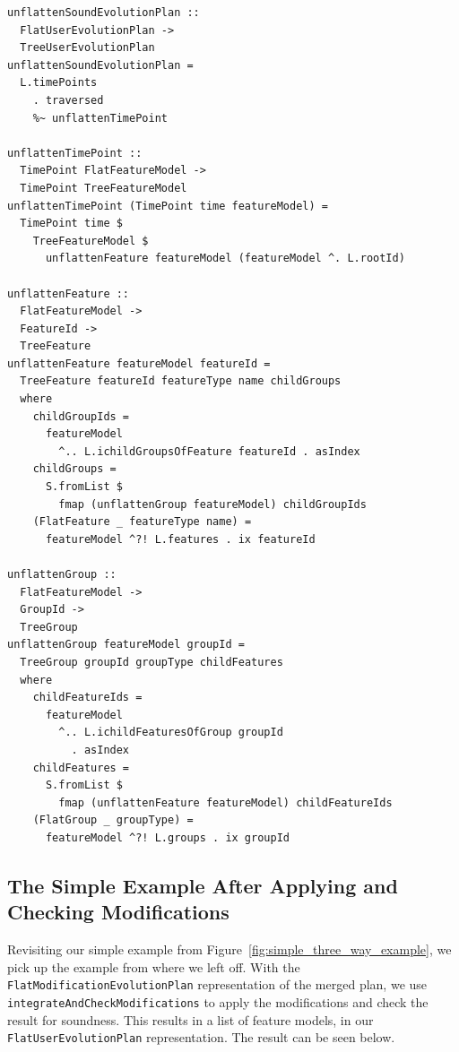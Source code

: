 \documentclass[a4paper,english]{ifimaster}
\begin{document}
\begin{verbatim}
unflattenSoundEvolutionPlan ::
  FlatUserEvolutionPlan ->
  TreeUserEvolutionPlan
unflattenSoundEvolutionPlan =
  L.timePoints
    . traversed
    %~ unflattenTimePoint

unflattenTimePoint ::
  TimePoint FlatFeatureModel ->
  TimePoint TreeFeatureModel
unflattenTimePoint (TimePoint time featureModel) =
  TimePoint time $
    TreeFeatureModel $
      unflattenFeature featureModel (featureModel ^. L.rootId)

unflattenFeature ::
  FlatFeatureModel ->
  FeatureId ->
  TreeFeature
unflattenFeature featureModel featureId =
  TreeFeature featureId featureType name childGroups
  where
    childGroupIds =
      featureModel
        ^.. L.ichildGroupsOfFeature featureId . asIndex
    childGroups =
      S.fromList $
        fmap (unflattenGroup featureModel) childGroupIds
    (FlatFeature _ featureType name) =
      featureModel ^?! L.features . ix featureId

unflattenGroup ::
  FlatFeatureModel ->
  GroupId ->
  TreeGroup
unflattenGroup featureModel groupId =
  TreeGroup groupId groupType childFeatures
  where
    childFeatureIds =
      featureModel
        ^.. L.ichildFeaturesOfGroup groupId
          . asIndex
    childFeatures =
      S.fromList $
        fmap (unflattenFeature featureModel) childFeatureIds
    (FlatGroup _ groupType) =
      featureModel ^?! L.groups . ix groupId
\end{verbatim}

\subsection{The Simple Example After Applying and Checking Modifications}%
\label{sub:the_simple_example_after_applying_and_checking_modifications}

Revisiting our simple example from Figure~\vref{fig:simple_three_way_example}, we pick up the example from where we left off. With the \texttt{FlatModificationEvolutionPlan} representation of the merged plan, we use \texttt{integrateAndCheckModifications} to apply the modifications and check the result for soundness. This results in a list of feature models, in our \texttt{FlatUserEvolutionPlan} representation. The result can be seen below.
\end{document}

